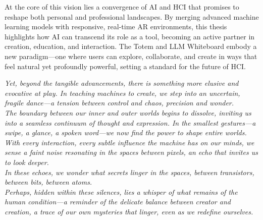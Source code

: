 At the core of this vision lies a convergence of AI and HCI that promises to reshape both personal and professional landscapes.
By merging advanced machine learning models with responsive, real-time AR environments, this thesis highlights how AI can transcend its role as a tool, becoming an active partner in creation, education, and interaction.
The Totem and LLM Whiteboard embody a new paradigm—one where users can explore, collaborate, and create in ways that feel natural yet profoundly powerful, setting a standard for the future of HCI.
\vspace{1em}
\begin{center}
    \begin{minipage}{0.8\textwidth} %
    \itshape
    Yet, beyond the tangible advancements, there is something more elusive and evocative at play. 
    In teaching machines to create, we step into an uncertain, fragile dance—a tension between control and chaos, precision and wonder. \\
    The boundary between our inner and outer worlds begins to dissolve, inviting us into a seamless continuum of thought and expression.
    In the smallest gestures—a swipe, a glance, a spoken word—we now find the power to shape entire worlds. \\
    With every interaction, every subtle influence the machine has on our minds, we sense a faint noise resonating in the spaces between pixels, an echo that invites us to look deeper.\\
    In these echoes, we wonder what secrets linger in the spaces, between transistors, between bits, between atoms.\\
    Perhaps, hidden within these silences, lies a whisper of what remains of the human condition—a reminder of the delicate balance between creator and creation, a trace of our own mysteries that linger, even as we redefine ourselves.
    \end{minipage}
\end{center}


